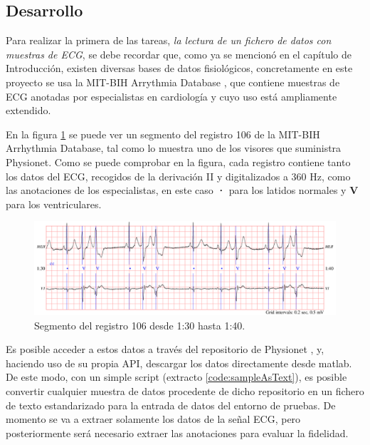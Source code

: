     \subsection{Desarrollo}

        Para realizar la primera de las tareas, \textit{la lectura de un fichero de datos con muestras de ECG}, se debe recordar que, como ya se mencionó en el capítulo de Introducción, existen diversas bases de datos fisiológicos, concretamente en este proyecto se usa la MIT-BIH Arrythmia Database \cite{MIT-BIH}, que contiene  muestras de ECG anotadas por especialistas en cardiología y cuyo uso está ampliamente extendido. 
        
        En la figura \ref{fig:106} se puede ver un segmento del registro 106 de la MIT-BIH Arrhythmia Database\cite{MIT-BIH}, tal como lo muestra uno de los visores que suministra Physionet\cite{phisionet}. Como se puede comprobar en la figura, cada registro contiene tanto los datos del ECG, recogidos de la derivación II y digitalizados a 360 Hz, como las anotaciones de los especialistas, en este caso \textbf{·} para los latidos normales y \textbf{V} para los ventriculares.
        
        \begin{figure}[H]  
                \centering
                        \includegraphics[width =\linewidth]{figuras/MITBIH106.png}
                \caption{Segmento del registro 106 desde 1:30 hasta 1:40.}
                \label{fig:106}
        \end{figure}
        
        Es posible acceder a estos datos a través del repositorio de Physionet \cite{phisionet}, y, haciendo uso de su propia API, descargar los datos directamente desde matlab. De este modo, con un simple script (extracto \ref{code:sampleAsText}), es posible convertir cualquier muestra de datos procedente de dicho repositorio en un fichero de texto estandarizado para la entrada de datos del entorno de pruebas. De momento se va a extraer solamente los datos de la señal ECG, pero posteriormente será necesario extraer las anotaciones para evaluar la fidelidad.
        
